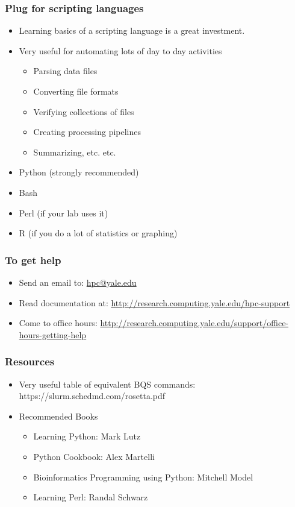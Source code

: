 \documentclass[10pt]{beamer}
\begin{document}
\begin{frame}[fragile]
\frametitle{Plug for scripting languages}

\begin{itemize}
\item Learning basics of a scripting language is a great investment.
\item Very useful for automating lots of day to day activities
\begin{itemize}
\item Parsing data files
\item Converting file formats
\item Verifying collections of files
\item Creating processing pipelines
\item Summarizing, etc. etc.
\end{itemize}
\item Python (strongly recommended)
\item Bash 
\item Perl (if your lab uses it)
\item R (if you do a lot of statistics or graphing)
\end{itemize}

\end{frame}

\begin{frame}
\frametitle{To get help}
\begin{itemize}
\item Send an email to: \url{hpc@yale.edu}
\item Read documentation at: \url{http://research.computing.yale.edu/hpc-support}
\item Come to office hours: \url{http://research.computing.yale.edu/support/office-hours-getting-help}
\end{itemize}
\end{frame}

\begin{frame}[fragile]
\frametitle{Resources}

\begin{itemize}
\item Very useful table of equivalent BQS commands: https://slurm.schedmd.com/rosetta.pdf
\item Recommended Books
\begin{itemize}
\item Learning Python: Mark Lutz
\item Python Cookbook: Alex Martelli
\item Bioinformatics Programming using Python: Mitchell Model
\item Learning Perl: Randal Schwarz
\end{itemize}
\end{itemize}

\end{frame}
\end{document}
